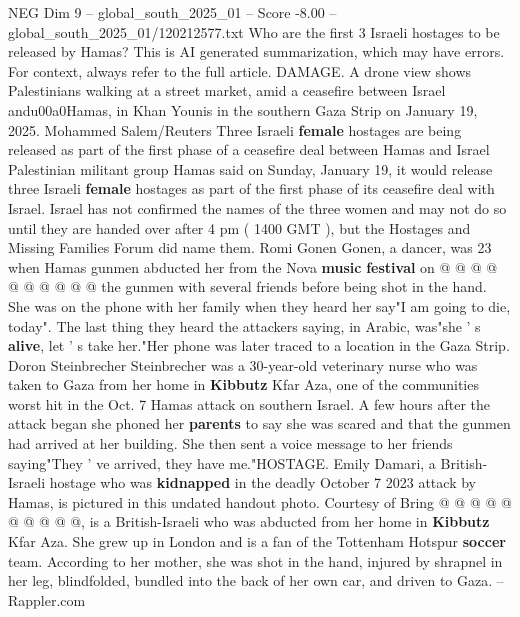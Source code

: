 \begin{textsample}{NEG Dim 9 – global\_south\_2025\_01 – Score -8.00 – global\_south\_2025\_01/120212577.txt}  \label{ex:f9_neg_133}
Who are the first 3 Israeli hostages to be released by Hamas?
This is AI generated summarization, which may have errors.
For context, always refer to the full article.
DAMAGE.
A drone view shows Palestinians walking at a street market, amid a ceasefire between Israel andu00a0Hamas, in Khan Younis in the southern Gaza Strip on January 19, 2025.
Mohammed Salem/Reuters Three Israeli \textbf{female} hostages are being released as part of the first phase of a ceasefire deal between Hamas and Israel Palestinian militant group Hamas said on Sunday, January 19, it would release three Israeli \textbf{female} hostages as part of the first phase of its ceasefire deal with Israel.
Israel has not confirmed the names of the three women and may not do so until they are handed over after 4 pm ( 1400 GMT ), but the Hostages and Missing Families Forum did name them.
Romi Gonen Gonen, a dancer, was 23 when Hamas gunmen abducted her from the Nova \textbf{music} \textbf{festival} on @ @ @ @ @ @ @ @ @ @ the gunmen with several friends before being shot in the hand.
She was on the phone with her family when they heard her say"I am going to die, today".
The last thing they heard the attackers saying, in Arabic, was"she ' s \textbf{alive}, let ' s take her."Her phone was later traced to a location in the Gaza Strip.
Doron Steinbrecher Steinbrecher was a 30-year-old veterinary nurse who was taken to Gaza from her home in \textbf{Kibbutz} Kfar Aza, one of the communities worst hit in the Oct. 7 Hamas attack on southern Israel.
A few hours after the attack began she phoned her \textbf{parents} to say she was scared and that the gunmen had arrived at her building.
She then sent a voice message to her friends saying"They ' ve arrived, they have me."HOSTAGE.
Emily Damari, a British-Israeli hostage who was \textbf{kidnapped} in the deadly October 7 2023 attack by Hamas, is pictured in this undated handout photo.
Courtesy of Bring @ @ @ @ @ @ @ @ @ @, is a British-Israeli who was abducted from her home in \textbf{Kibbutz} Kfar Aza.
She grew up in London and is a fan of the Tottenham Hotspur \textbf{soccer} team.
According to her mother, she was shot in the hand, injured by shrapnel in her leg, blindfolded, bundled into the back of her own car, and driven to Gaza. -- Rappler.com

\end{textsample}
